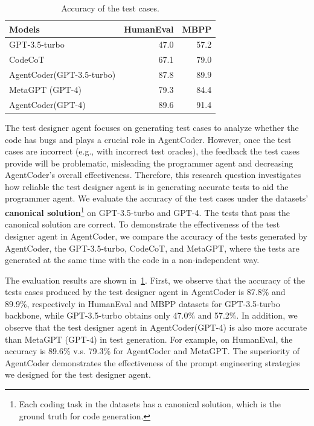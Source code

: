\documentclass{article}
\newcommand{\xxx}{AgentCoder\xspace}
\begin{document}
\begin{table}\scriptsize
    \centering
    \vspace{-0.5cm}
    \caption{Accuracy of the test cases.}
    \begin{tabular}{lrr}
    \toprule
    Models&HumanEval&MBPP\\
    \midrule
        GPT-3.5-turbo&47.0&57.2\\
        CodeCoT&67.1&79.0\\
         \xxx (GPT-3.5-turbo)&87.8&89.9\\
         \hline
         MetaGPT (GPT-4)&79.3&84.4\\
         \xxx (GPT-4) &89.6&91.4\\
         
         \bottomrule
    \end{tabular}
    \label{tab:testcase}
\end{table}
The test designer agent focuses on generating test cases to analyze whether the code has bugs and plays a crucial role in \xxx. However, once the test cases are incorrect (e.g., with incorrect test oracles), the feedback the test cases provide will be problematic, misleading the programmer agent and decreasing \xxx's overall effectiveness. 
Therefore, this research question investigates how reliable the test designer agent is in generating accurate tests to aid the programmer agent. 
We evaluate the accuracy of the test cases under the datasets' \textbf{canonical solution}\footnote{Each coding task in the datasets has a canonical solution, which is the ground truth for code generation.} on GPT-3.5-turbo and GPT-4. The tests that pass the canonical solution are correct. 
To demonstrate the effectiveness of the test designer agent in \xxx, we compare the accuracy of the tests generated by \xxx, the GPT-3.5-turbo, CodeCoT, and MetaGPT, where the tests are generated at the same time with the code in a non-independent way.  




The evaluation results are shown in~\cref{tab:testcase}.
First, we observe that the accuracy of the tests cases produced by the test designer agent in \xxx is 87.8\% and 89.9\%, respectively in HumanEval and MBPP datasets for GPT-3.5-turbo backbone, while GPT-3.5-turbo obtains only 47.0\% and 57.2\%. In addition, we observe that the test designer agent in \xxx (GPT-4) is also more accurate than MetaGPT (GPT-4) in test generation. For example, on HumanEval, the accuracy is 89.6\% v.s. 79.3\% for \xxx and MetaGPT. The superiority of \xxx demonstrates the effectiveness of the prompt engineering strategies we designed for the test designer agent. 
\end{document}
